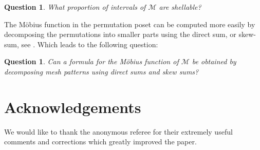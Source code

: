\documentclass[preprint,11pt]{elsarticle}
\newtheorem{que}[thm]{Question}\crefname{que}{Question}{Questions}
\numberwithin{equation}{section}
\numberwithin{figure}{section}
\numberwithin{thm}{section}
\begin{document}
\begin{que}
What proportion of intervals of $\mathcal{M}$ are shellable?
\end{que}

The M\"obius function in the permutation poset can be computed more easily by decomposing the
permutations into smaller parts using the direct sum, or skew-sum, see \cite{BJJS11,McSt13}. Which
leads to the following question:
\begin{que}
Can a formula for the M\"obius function of $\mathcal{M}$ be obtained by decomposing mesh patterns
using direct sums and skew sums?
\end{que}

\section*{Acknowledgements} 
We would like to thank the anonymous referee for their extremely useful comments and corrections which greatly improved the paper.
\end{document}
